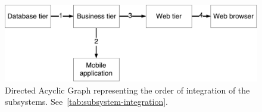 \begin{figure}[h]
    \centering
    \includegraphics[width=\textwidth]{figures/subsystems_integration_dag.pdf}
    \caption{Directed Acyclic Graph representing the order of integration of the subsystems. See~\autoref{tab:subsystem-integration}.}
    \label{fig:subsystem-integration}
\end{figure}
